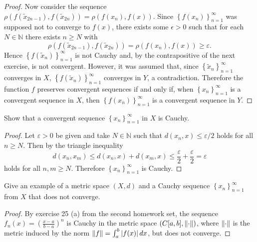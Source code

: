 \documentclass[12pt]{amsart}
\begin{document}
\begin{setup}
\begin{ex}
\begin{proof}
      Now consider the sequence $\rho(f(\tilde{x}_{2n-1}), f(\tilde{x}_{2n})) = \rho(f(x_n), f(x))$.
      Since $\left\{f(x_n)\right\}_{n=1}^\infty$ was supposed not to converge to $f(x)$, there exists some $\epsilon > 0$ such that for each $N \in \mathbb{N}$ there exists $n \geq N$ with 
      $$\rho(f(\tilde{x}_{2n-1}), f(\tilde{x}_{2n})) = \rho(f(x_n), f(x)) \geq \varepsilon.$$
      Hence $\left\{f(\tilde{x}_n)\right\}_{n=1}^\infty$ is not Cauchy and, by the contrapositive of the next exercise, is not convergent.
      However, it was assumed that, since $\left\{\tilde{x}_n\right\}_{n=1}^\infty$ converges in $X$, $\left\{f(\tilde{x}_n)\right\}_{n=1}^\infty$ converges in $Y$, a contradiction.
      Therefore the function $f$ preserves convergent sequences if and only if, when $\left\{x_n\right\}_{n=1}^\infty$ is a convergent sequence in $X$, then $\left\{f(x_n)\right\}_{n=1}^\infty$ is a convergent sequence in $Y$.
    \end{proof}
  \end{ex}

  \begin{ex}
    Show that a convergent sequence $\left\{x_n\right\}_{n=1}^\infty$ in $X$ is Cauchy.
    \begin{proof}
      Let $\varepsilon > 0$ be given and take $N \in \mathbb{N}$ such that $d(x_n, x) \leq \varepsilon/2$ holds for all $n \geq N$.  
      Then by the triangle inequality 
      $$d(x_n, x_m) \leq d(x_n, x) + d(x_m, x) \leq \frac{\varepsilon}{2} + \frac{\varepsilon}{2} = \varepsilon$$
      holds for all $n,m \geq N$.
      Therefore $\left\{x_n\right\}_{n=1}^\infty$ is Cauchy.
    \end{proof}
  \end{ex}

  \begin{ex}
    Give an example of a metric space $(X,d)$ and a Cauchy sequence $\left\{x_n\right\}_{n=1}^\infty$ from $X$ that does not converge.
    \begin{proof}
      By exercise 25 (a) from the second homework set, the sequence $f_n(x) = \left(\frac{x-a}{b-a}\right)^n$ is Cauchy in the metric space $(C[a,b],\lVert\cdot\rVert)$, where $\lVert\cdot\rVert$ is the metric induced by the norm $\lVert f\rVert = \int_a^b \left| f(x) \right|dx$, but does not converge.
    \end{proof}
  \end{ex}


\end{setup}
\end{document}
